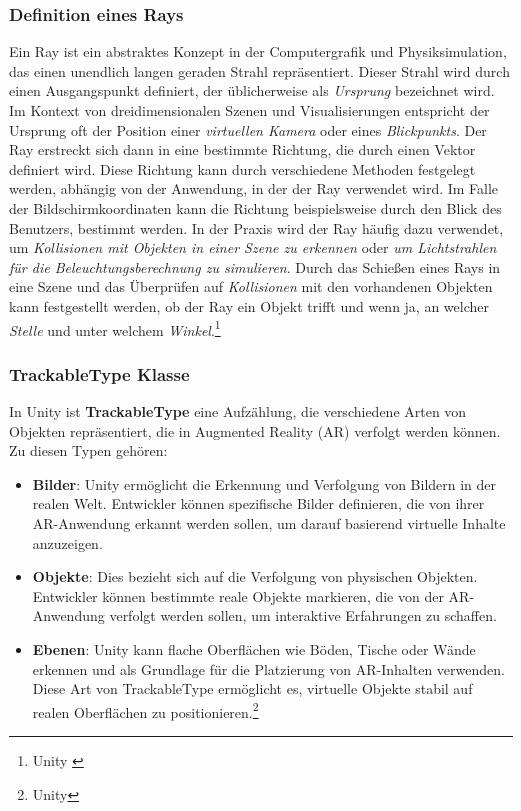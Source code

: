 \subsubsection{\label{sec:Raycast}Definition eines Rays}
Ein Ray ist ein abstraktes Konzept in der Computergrafik und Physiksimulation, das einen unendlich langen geraden Strahl repräsentiert. Dieser Strahl wird durch einen Ausgangspunkt definiert, der üblicherweise als \textit{Ursprung} bezeichnet wird. Im Kontext von dreidimensionalen Szenen und Visualisierungen entspricht der Ursprung oft der Position einer \textit{virtuellen Kamera} oder eines \textit{Blickpunkts}. Der Ray erstreckt sich dann in eine bestimmte Richtung, die durch einen Vektor definiert wird. Diese Richtung kann durch verschiedene Methoden festgelegt werden, abhängig von der Anwendung, in der der Ray verwendet wird. Im Falle der Bildschirmkoordinaten kann die Richtung beispielsweise durch  den Blick des Benutzers, bestimmt werden. In der Praxis wird der Ray häufig dazu verwendet, um \textit{Kollisionen mit Objekten in einer Szene zu erkennen} oder \textit{um Lichtstrahlen für die Beleuchtungsberechnung zu simulieren}. Durch das Schießen eines Rays in eine Szene und das Überprüfen auf \textit{Kollisionen} mit den vorhandenen Objekten kann festgestellt werden, ob der Ray ein Objekt trifft und wenn ja, an welcher \textit{Stelle} und unter welchem \textit{Winkel}.\protect\footnote{Unity \cite{Raycast}}\\

\subsubsection{\label{sec:TrackableType}TrackableType Klasse}
In Unity ist \textbf{TrackableType} eine Aufzählung, die verschiedene Arten von Objekten repräsentiert, die in Augmented Reality (AR) verfolgt werden können. Zu diesen Typen gehören:

\begin{itemize}
    \item \textbf{Bilder}: Unity ermöglicht die Erkennung und Verfolgung von Bildern in der realen Welt. Entwickler können spezifische Bilder definieren, die von ihrer AR-Anwendung erkannt werden sollen, um darauf basierend virtuelle Inhalte anzuzeigen.

    \item \textbf{Objekte}: Dies bezieht sich auf die Verfolgung von physischen Objekten. Entwickler können bestimmte reale Objekte markieren, die von der AR-Anwendung verfolgt werden sollen, um interaktive Erfahrungen zu schaffen.

    \item \textbf{Ebenen}: Unity kann flache Oberflächen wie Böden, Tische oder Wände erkennen und als Grundlage für die Platzierung von AR-Inhalten verwenden. Diese Art von TrackableType ermöglicht es, virtuelle Objekte stabil auf realen Oberflächen zu positionieren.\protect\footnote{Unity\cite{TrackableType}}
\end{itemize}



